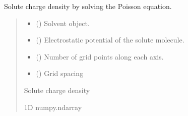 \documentclass[letterpaper,10pt,english]{sphinxmanual}
\begin{document}

\begin{fulllineitems}
\label{\detokenize{fcdft.solvent:fcdft.solvent.pbe.make_rho_sol}}
\pysigstartsignatures
\pysiglinewithargsret
{}
{\sphinxparamcomma {}\sphinxparamcomma {}\sphinxparamcomma {}}
{}
\pysigstopsignatures
\sphinxAtStartPar
Solute charge density by solving the Poisson equation.
\begin{quote}\begin{description}
\begin{itemize}
\item {} 
\sphinxAtStartPar
{} ({\hyperref[\detokenize{fcdft.solvent:fcdft.solvent.pbe.PBE}]{}}) \textendash{} Solvent object.

\item {} 
\sphinxAtStartPar
{} () \textendash{} Electrostatic potential of the solute molecule.

\item {} 
\sphinxAtStartPar
{} () \textendash{} Number of grid points along each axis.

\item {} 
\sphinxAtStartPar
{} () \textendash{} Grid spacing

\end{itemize}

\sphinxAtStartPar
Solute charge density

\sphinxAtStartPar
1D numpy.ndarray

\end{description}\end{quote}

\end{fulllineitems}
\end{document}
